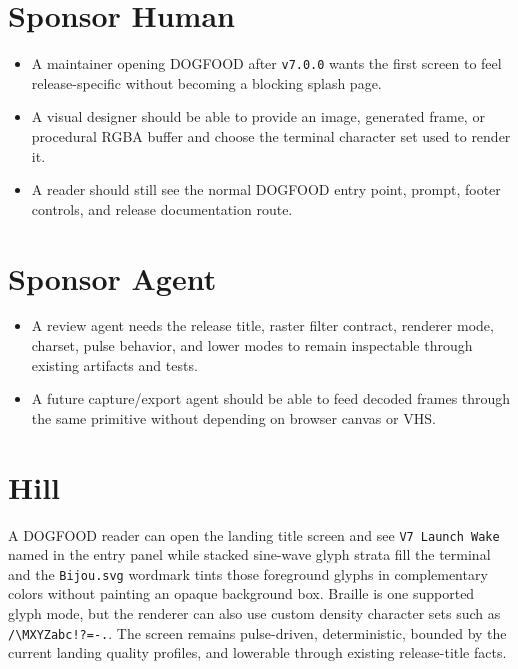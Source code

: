 \section{Sponsor Human}\label{record-113-sponsor-human}

\begin{itemize}
\tightlist
\item
  A maintainer opening DOGFOOD after \texttt{v\allowbreak{}7\allowbreak{}.\allowbreak{}0\allowbreak{}.\allowbreak{}0} wants the first screen to feel release-specific without becoming a blocking splash page.
\item
  A visual designer should be able to provide an image, generated frame, or procedural RGBA buffer and choose the terminal character set used to render it.
\item
  A reader should still see the normal DOGFOOD entry point, prompt, footer controls, and release documentation route.
\end{itemize}

\section{Sponsor Agent}\label{record-113-sponsor-agent}

\begin{itemize}
\tightlist
\item
  A review agent needs the release title, raster filter contract, renderer mode, charset, pulse behavior, and lower modes to remain inspectable through existing artifacts and tests.
\item
  A future capture/export agent should be able to feed decoded frames through the same primitive without depending on browser canvas or VHS.
\end{itemize}

\section{Hill}\label{record-113-hill}

A DOGFOOD reader can open the landing title screen and see \texttt{V\allowbreak{}7\allowbreak{} \allowbreak{}L\allowbreak{}a\allowbreak{}u\allowbreak{}n\allowbreak{}c\allowbreak{}h\allowbreak{} \allowbreak{}W\allowbreak{}a\allowbreak{}k\allowbreak{}e} named in the entry panel while stacked sine-wave glyph strata fill the terminal and the \texttt{B\allowbreak{}i\allowbreak{}j\allowbreak{}o\allowbreak{}u\allowbreak{}.\allowbreak{}s\allowbreak{}v\allowbreak{}g} wordmark tints those foreground glyphs in complementary colors without painting an opaque background box. Braille is one supported glyph mode, but the renderer can also use custom density character sets such as \texttt{/\allowbreak{}\textbackslash{}\allowbreak{}M\allowbreak{}X\allowbreak{}Y\allowbreak{}Z\allowbreak{}a\allowbreak{}b\allowbreak{}c\allowbreak{}!\allowbreak{}?\allowbreak{}=\allowbreak{}-\allowbreak{}.}. The screen remains pulse-driven, deterministic, bounded by the current landing quality profiles, and lowerable through existing release-title facts.


